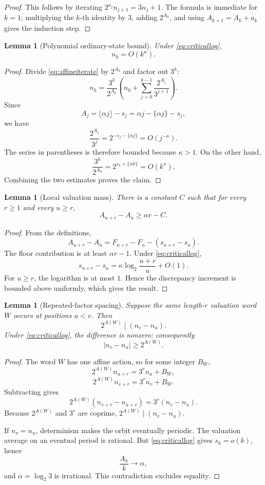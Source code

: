 \documentclass[11pt]{amsart}
\newtheorem{lemma}[theorem]{Lemma}
\begin{document}
\begin{proof}
This follows by iterating
\(2^{a_j}n_{j+1}=3n_j+1\).  The formula is immediate for \(k=1\); multiplying the \(k\)-th identity by \(3\), adding \(2^{A_k}\), and using \(A_{k+1}=A_k+a_k\) gives the induction step.
\end{proof}

\begin{lemma}[Polynomial ordinary-state bound]\label{lem:poly}
Under \eqref{eq:criticallog},
\[
 n_k=O(k^\kappa).
\]
\end{lemma}

\begin{proof}
Divide \eqref{eq:affineiterate} by \(2^{A_k}\) and factor out \(3^k\):
\[
 n_k=\frac{3^k}{2^{A_k}}
 \left(
 n_0+\sum_{j=0}^{k-1}\frac{2^{A_j}}{3^{j+1}}
 \right).
\]
Since
\[
 A_j=\lfloor\alpha j\rfloor-s_j
 =\alpha j-\{\alpha j\}-s_j,
\]
we have
\[
 \frac{2^{A_j}}{3^j}
 =2^{-s_j-\{\alpha j\}}
 =O(j^{-\kappa}).
\]
The series in parentheses is therefore bounded because \(\kappa>1\).  On the other hand,
\[
 \frac{3^k}{2^{A_k}}
 =2^{s_k+\{\alpha k\}}
 =O(k^\kappa).
\]
Combining the two estimates proves the claim.
\end{proof}

\begin{lemma}[Local valuation mass]\label{lem:localmass}
There is a constant \(C\) such that for every \(r\ge1\) and every \(u\ge r\),
\[
 A_{u+r}-A_u\ge \alpha r-C.
\]
\end{lemma}

\begin{proof}
From the definitions,
\[
 A_{u+r}-A_u
 =F_{u+r}-F_u-(s_{u+r}-s_u).
\]
The floor contribution is at least \(\alpha r-1\).  Under \eqref{eq:criticallog},
\[
 s_{u+r}-s_u
 =\kappa\log_2\frac{u+r}{u}+O(1).
\]
For \(u\ge r\), the logarithm is at most \(1\).  Hence the discrepancy increment is bounded above uniformly, which gives the result.
\end{proof}

\begin{lemma}[Repeated-factor spacing]\label{lem:repeat}
Suppose the same length-\(r\) valuation word \(W\) occurs at positions \(u<v\).  Then
\[
 2^{A(W)}\mid(n_v-n_u).
\]
Under \eqref{eq:criticallog}, the difference is nonzero; consequently
\[
 |n_v-n_u|\ge2^{A(W)}.
\]
\end{lemma}

\begin{proof}
The word \(W\) has one affine action, so for some integer \(B_W\),
\[
 2^{A(W)}n_{u+r}=3^r n_u+B_W,
\]
\[
 2^{A(W)}n_{v+r}=3^r n_v+B_W.
\]
Subtracting gives
\[
 2^{A(W)}(n_{v+r}-n_{u+r})
 =3^r(n_v-n_u).
\]
Because \(2^{A(W)}\) and \(3^r\) are coprime,
\(2^{A(W)}\mid(n_v-n_u)\).

If \(n_v=n_u\), determinism makes the orbit eventually periodic.  The valuation average on an eventual period is rational.  But \eqref{eq:criticallog} gives \(s_k=o(k)\), hence
\[
 \frac{A_k}{k}\longrightarrow\alpha,
\]
and \(\alpha=\log_2 3\) is irrational.  This contradiction excludes equality.
\end{proof}
\end{document}
